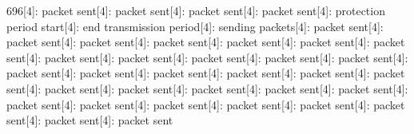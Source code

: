 \documentclass[parskip]{cs4rep}
\begin{document}
696[4]: packet sent[4]: packet sent[4]: packet sent[4]: packet sent[4]: protection period start[4]: end transmission period[4]: sending packets[4]: packet sent[4]: packet sent[4]: packet sent[4]: packet sent[4]: packet sent[4]: packet sent[4]: packet sent[4]: packet sent[4]: packet sent[4]: packet sent[4]: packet sent[4]: packet sent[4]: packet sent[4]: packet sent[4]: packet sent[4]: packet sent[4]: packet sent[4]: packet sent[4]: packet sent[4]: packet sent[4]: packet sent[4]: packet sent[4]: packet sent[4]: packet sent[4]: packet sent[4]: packet sent[4]: packet sent[4]: packet sent[4]: packet sent[4]: packet sent[4]: packet sent\newline
\end{document}
